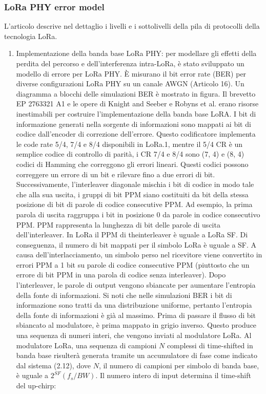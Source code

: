 \documentclass[a4paper]{report} %
\begin{document}
\subsubsection{LoRa PHY error model}
L'articolo \cite{art:rif.49} descrive nel dettaglio i livelli e i sottolivelli della pila di protocolli della tecnologia LoRa.
\begin{enumerate}
\item Implementazione della banda base LoRa PHY: 
per modellare gli effetti della perdita del percorso e dell'interferenza intra-LoRa, è stato sviluppato un modello di errore per LoRa PHY. È misurano il bit error rate (BER) per diverse configurazioni LoRa PHY su un canale AWGN (Articolo 16). Un diagramma a blocchi delle simulazioni BER è mostrato in figura. Il brevetto EP 2763321 A1 e le opere di Knight and Seeber  e Robyns et al. erano risorse inestimabili per costruire l'implementazione della banda base LoRA. I bit di informazione generati nella sorgente di informazioni sono mappati ai bit di codice dall'encoder di correzione dell'errore. Questo codificatore implementa le code rate 5/4, 7/4 e 8/4 disponibili in LoRa.1, mentre il 5/4 CR è un semplice codice di controllo di parità, i CR 7/4 e 8/4 sono (7, 4) e (8, 4) codici di Hamming che correggono gli errori lineari. Questi codici possono correggere un errore di un bit e rilevare fino a due errori di bit. Successivamente, l'interleaver diagonale mischia i bit di codice in modo tale che alla sua uscita, i gruppi di bit PPM siano costituiti da bit della stessa posizione di bit di parole di codice consecutive PPM. Ad esempio, la prima parola di uscita raggruppa i bit in posizione 0 da parole in codice consecutivo PPM. PPM rappresenta la lunghezza di bit delle parole di uscita dell'interleaver. In LoRa il PPM di theinterleaver è uguale a LoRa SF. Di conseguenza, il numero di bit mappati per il simbolo LoRa è uguale a SF. A causa dell'interlacciamento, un simbolo perso nel ricevitore viene convertito in errori PPM a 1 bit su parole di codice consecutive PPM (piuttosto che un errore di bit PPM in una parola di codice senza interleaver). Dopo l'interleaver, le parole di output vengono sbiancate per aumentare l'entropia della fonte di informazioni. Si noti che nelle simulazioni BER i bit di informazione sono tratti da una distribuzione uniforme, pertanto l'entropia della fonte di informazioni è già al massimo. Prima di passare il flusso di bit sbiancato al modulatore, è prima mappato in grigio inverso. Questo produce una sequenza di numeri interi, che vengono inviati al modulatore LoRa. Al modulatore LoRa, una sequenza di campioni $N$ complessi di time-shifted in banda base risulterà generata tramite un accumulatore di fase come indicato dal sistema (2.12), dove $N$, il numero di campioni per simbolo di banda base, è uguale a $2^{SF} (f_s / BW)$. Il numero intero di input determina il time-shift del up-chirp:

\end{enumerate}
\end{document}
